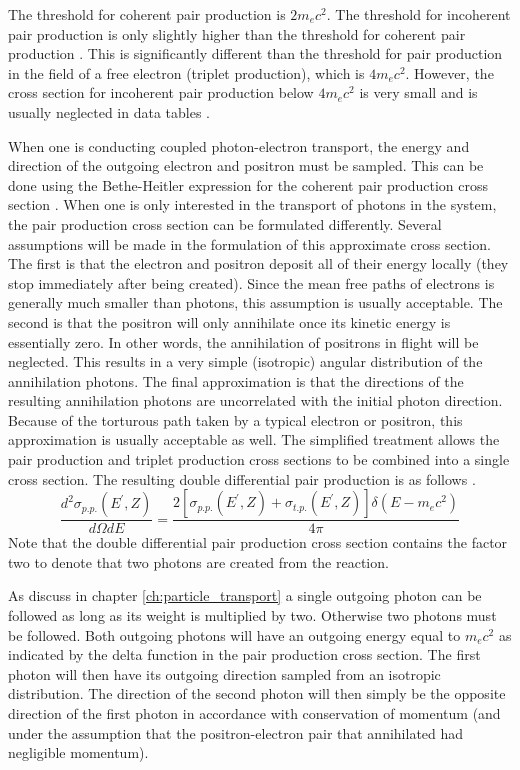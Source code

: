 The threshold for coherent pair production is $2m_ec^2$. The threshold for 
incoherent pair production is only slightly higher than the threshold for 
coherent pair production \citep{hubbell_pair_1980}. This is significantly 
different than the threshold for pair production in the field of a free 
electron (triplet production), which is $4m_ec^2$. However, the cross section 
for incoherent pair production below $4m_ec^2$ is very small and is usually 
neglected in data tables \citep{hubbell_pair_1980}. 

When one is conducting coupled photon-electron transport, the energy and 
direction of the outgoing electron and positron must be sampled. This can
be done using the Bethe-Heitler expression for the coherent pair production
cross section \citep{mukhin_experimental_1987, salvat_physics_2001}. When one 
is only interested in the transport of photons in the system, the pair 
production cross section can be formulated differently. Several assumptions 
will be made in the formulation of this approximate cross section. The first is 
that the electron and positron deposit all of their energy locally (they stop 
immediately after being created). Since the mean free paths of electrons is 
generally much smaller than photons, this assumption is usually acceptable. The 
second is that the positron will only annihilate once its kinetic energy is 
essentially zero. In other words, the annihilation of positrons in flight will 
be neglected. This results in a very simple (isotropic) angular distribution of 
the annihilation photons. The final approximation is that the directions of the 
resulting annihilation photons are uncorrelated with the initial photon 
direction. Because of the torturous path taken by a typical electron or 
positron, this approximation is usually acceptable as well. The simplified 
treatment allows the pair production and triplet production cross sections to 
be combined into a single cross section. The resulting double differential pair 
production is as follows \citep{hoogenboom_adjoint_2000,gabler_amos_2006}.
\begin{equation}
  \frac{d^2\sigma_{p.p.}(E^{'},Z)}{d\Omega dE} = \frac{2 [\sigma_{p.p.}(E^{'},Z) 
    + \sigma_{t.p.}(E^{'},Z)] \delta(E - m_ec^2)}{4\pi}
\end{equation}
Note that the double differential pair production cross section contains the 
factor two to denote that two photons are created from the reaction. 

As discuss in chapter \ref{ch:particle_transport} a single outgoing photon can
be followed as long as its weight is multiplied by two. Otherwise two photons
must be followed. Both outgoing photons will have an outgoing energy equal to
$m_ec^2$ as indicated by the delta function in the pair production cross 
section. The first photon will then have its outgoing direction sampled from
an isotropic distribution. The direction of the second photon will then simply
be the opposite direction of the first photon in accordance with conservation
of momentum (and under the assumption that the positron-electron pair that
annihilated had negligible momentum).

